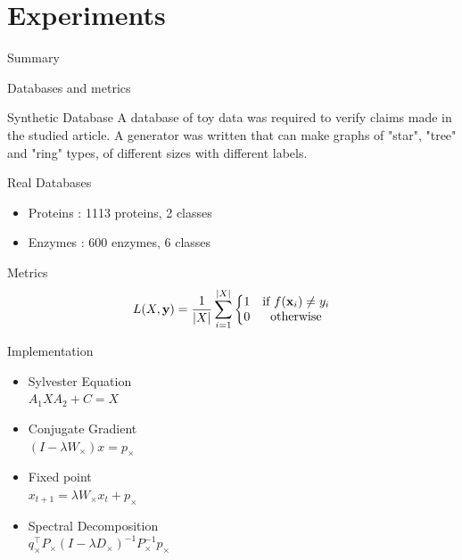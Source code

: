 \documentclass[compress]{beamer}
\DeclarePairedDelimiter{\abs}{\lvert}{\rvert}
\let\vec\mathbf
\begin{document}
\section{Experiments}
\begin{frame}{Summary}
  \tableofcontents[currentsection]
\end{frame}
\begin{frame}{Databases and metrics}
    \begin{block}{Synthetic Database}
    	A database of toy data was required to verify claims made in the studied article. A generator was written that can make graphs of "star", "tree" and "ring" types, of different sizes with different labels.
    \end{block}
	\pause
	\begin{block}{Real Databases}
		\begin{itemize}
			\item Proteins : 1113 proteins, 2 classes
			\item Enzymes : 600 enzymes, 6 classes
		\end{itemize}
	\end{block}
	\pause
	\begin{block}{Metrics}
		\begin{equation*}
		L(X,\vec{y})=\frac{1}{\abs{X}}\sum\limits_{i=1}^{\abs{X}}\left\{
		\begin{matrix}
		1 & \mbox{if } f(\vec{x}_i) \neq y_i \\
		0 & \mbox{otherwise}
		\end{matrix}
		\right.
		\end{equation*}
	\end{block}
\end{frame}
\begin{frame}{Implementation}
	\begin{multicols}{2}
		\begin{itemize}
			\setlength\itemsep{4em}
			\item Sylvester Equation\\$A_{1}XA_{2}+C=X$
			\pause
			\item Conjugate Gradient\\$(I-\lambda W_{\times})x=p_{\times}$
			\pause
			\setlength\itemsep{4em}
			\item Fixed point\\$x_{t+1}=\lambda W_{\times}x_{t}+p_{\times}$
			\pause
			\item Spectral Decomposition\\$q_{\times}^{\top}P_{\times}(I-\lambda D_{\times})^{-1}P_{\times}^{-1}p_{\times}$
		\end{itemize}
	\end{multicols}
\end{frame}
\end{document}
